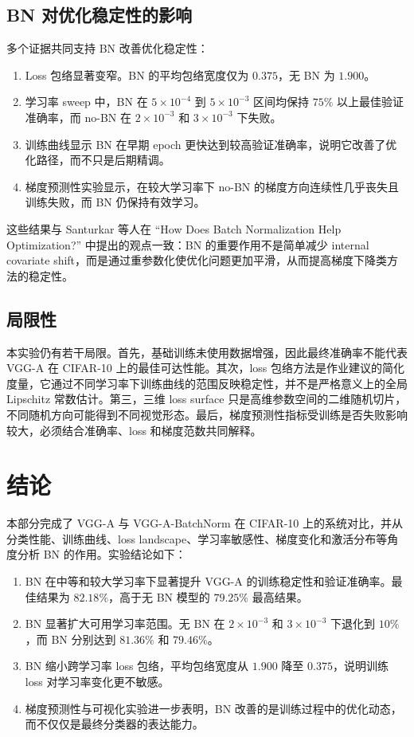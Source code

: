 \documentclass[UTF8,a4paper,11pt]{ctexart}
\begin{document}
\subsection{BN 对优化稳定性的影响}

多个证据共同支持 BN 改善优化稳定性：
\begin{enumerate}
  \item Loss 包络显著变窄。BN 的平均包络宽度仅为 $0.375$，无 BN 为 $1.900$。
  \item 学习率 sweep 中，BN 在 $5\times10^{-4}$ 到 $5\times10^{-3}$ 区间均保持 $75\%$ 以上最佳验证准确率，而 no-BN 在 $2\times10^{-3}$ 和 $3\times10^{-3}$ 下失败。
  \item 训练曲线显示 BN 在早期 epoch 更快达到较高验证准确率，说明它改善了优化路径，而不只是后期精调。
  \item 梯度预测性实验显示，在较大学习率下 no-BN 的梯度方向连续性几乎丧失且训练失败，而 BN 仍保持有效学习。
\end{enumerate}

这些结果与 Santurkar 等人在 ``How Does Batch Normalization Help Optimization?'' 中提出的观点一致：BN 的重要作用不是简单减少 internal covariate shift，而是通过重参数化使优化问题更加平滑，从而提高梯度下降类方法的稳定性。

\subsection{局限性}

本实验仍有若干局限。首先，基础训练未使用数据增强，因此最终准确率不能代表 VGG-A 在 CIFAR-10 上的最佳可达性能。其次，loss 包络方法是作业建议的简化度量，它通过不同学习率下训练曲线的范围反映稳定性，并不是严格意义上的全局 Lipschitz 常数估计。第三，三维 loss surface 只是高维参数空间的二维随机切片，不同随机方向可能得到不同视觉形态。最后，梯度预测性指标受训练是否失败影响较大，必须结合准确率、loss 和梯度范数共同解释。

\section{结论}

本部分完成了 VGG-A 与 VGG-A-BatchNorm 在 CIFAR-10 上的系统对比，并从分类性能、训练曲线、loss landscape、学习率敏感性、梯度变化和激活分布等角度分析 BN 的作用。实验结论如下：

\begin{enumerate}
  \item BN 在中等和较大学习率下显著提升 VGG-A 的训练稳定性和验证准确率。最佳结果为 $82.18\%$，高于无 BN 模型的 $79.25\%$ 最高结果。
  \item BN 显著扩大可用学习率范围。无 BN 在 $2\times10^{-3}$ 和 $3\times10^{-3}$ 下退化到 $10\%$，而 BN 分别达到 $81.36\%$ 和 $79.46\%$。
  \item BN 缩小跨学习率 loss 包络，平均包络宽度从 $1.900$ 降至 $0.375$，说明训练 loss 对学习率变化更不敏感。
  \item 梯度预测性与可视化实验进一步表明，BN 改善的是训练过程中的优化动态，而不仅仅是最终分类器的表达能力。
\end{enumerate}
\end{document}
